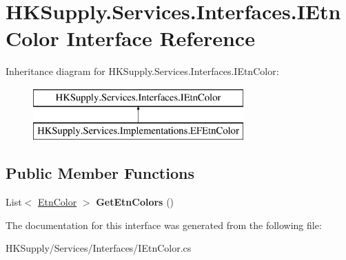 \hypertarget{interface_h_k_supply_1_1_services_1_1_interfaces_1_1_i_etn_color}{}\section{H\+K\+Supply.\+Services.\+Interfaces.\+I\+Etn\+Color Interface Reference}
\label{interface_h_k_supply_1_1_services_1_1_interfaces_1_1_i_etn_color}
Inheritance diagram for H\+K\+Supply.\+Services.\+Interfaces.\+I\+Etn\+Color\+:\begin{figure}[H]
\begin{center}
\leavevmode
\includegraphics[height=2.000000cm]{interface_h_k_supply_1_1_services_1_1_interfaces_1_1_i_etn_color}
\end{center}
\end{figure}
\subsection*{Public Member Functions}
\begin{DoxyCompactItemize}
\item 
\mbox{\label{interface_h_k_supply_1_1_services_1_1_interfaces_1_1_i_etn_color_abdffe01089d0dad706eb92e957987971}} 
List$<$ \mbox{\hyperlink{class_h_k_supply_1_1_models_1_1_etn_color}{Etn\+Color}} $>$ {\bfseries Get\+Etn\+Colors} ()
\end{DoxyCompactItemize}


The documentation for this interface was generated from the following file\+:\begin{DoxyCompactItemize}
\item 
H\+K\+Supply/\+Services/\+Interfaces/I\+Etn\+Color.\+cs\end{DoxyCompactItemize}

